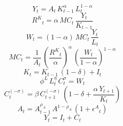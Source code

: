 \noindent[name= `Función de producción']
\begin{dmath}
{Y}_{t}={A}_{t}\, {K}_{t-1}^{{\alpha}}\, {L}_{t}^{1-{\alpha}}
\end{dmath}
\noindent[name= `Demanda de capital']
\begin{dmath}
{R^{K}}_{t}={\alpha}\, {MC}_{t}\, \frac{{Y}_{t}}{{K}_{t-1}}
\end{dmath}
\noindent[name= `Demanda de trabajo']
\begin{dmath}
{W}_{t}=\left(1-{\alpha}\right)\, {MC}_{t}\, \frac{{Y}_{t}}{{L}_{t}}
\end{dmath}
\noindent[name= `Costos marginales']
\begin{dmath}
{MC}_{t}=\frac{1}{{A}_{t}}\, \left(\frac{{R^{K}}_{t}}{{\alpha}}\right)^{{\alpha}}\, \left(\frac{{W}_{t}}{1-{\alpha}}\right)^{1-{\alpha}}
\end{dmath}
\noindent[name= `Ley de acumulación de capital']
\begin{dmath}
{K}_{t}={K}_{t-1}\, \left(1-{\delta}\right)+{I}_{t}
\end{dmath}
\noindent[name= `Oferta de trabajo']
\begin{dmath}
{\phi^{L}}\, {L}_{t}^{{\eta}}\, {C}_{t}^{{\sigma}}={W}_{t}
\end{dmath}
\noindent[name= `Ecuación de Euler']
\begin{dmath}
{C}_{t}^{\left(-{\sigma}\right)}={\beta}\, {C}_{t+1}^{\left(-{\sigma}\right)}\, \left(1-{\delta}+\frac{{\alpha}\, {Y}_{t+1}}{{K}_{t}}\right)
\end{dmath}
\noindent[name= `Productividad']
\begin{dmath}
{A}_{t}={A}_{t-1}^{{\rho_{A}}}\, {A}^{1-{\rho_{A}}}\, \left(1+{\epsilon^{A}}_{t}\right)
\end{dmath}
\noindent[name= `Demanda agregada']
\begin{dmath}
{Y}_{t}={I}_{t}+{C}_{t}
\end{dmath}
